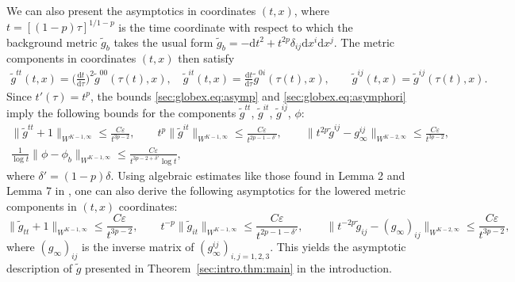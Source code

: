\documentclass{article}
\newcommand{\de}{\mathrm{d}}
\newcommand{\wt}{\widetilde}
\newcommand{\ve}{\varepsilon}
\begin{document}
\begin{remark}[Asymptotics]
    We can also present the asymptotics in coordinates $(t,x)$, where $t = [(1-p)\tau]^{1/1-p}$ is the time coordinate with respect to which the background metric $\wt{g}_b$ takes the usual form $\wt{g}_b = -\de t^2 +t^{2p}\delta_{ij}\de x^i\de x^j$. The metric components in coordinates $(t,x)$ then satisfy
    \begin{align}
        \wt{g}^{tt}(t,x) = \Big(\frac{\de t}{\de \tau}\Big)^2 \wt{g}^{00}(\tau(t),x),\quad \wt{g}^{it}(t,x) = \frac{\de t}{\de \tau}\wt{g}^{0i}(\tau(t),x),\qquad \wt{g}^{ij}(t,x) = \wt{g}^{ij}(\tau(t),x).
    \end{align}
    Since $t'(\tau) = t^p$, the bounds \eqref{sec:globex.eq:asymp} and \eqref{sec:globex.eq:asymphori} imply the following bounds for the components $\wt{g}^{tt}$, $\wt{g}^{it}$, $\wt{g}^{ij}$, $\phi$:
    \begin{gather}
        \|\wt{g}^{tt} + 1\|_{W^{K-1,\infty}} \leq \frac{C\ve}{t^{3p-2}},\qquad
        t^p\|\wt{g}^{it}\|_{W^{K-1,\infty}} \leq \frac{C\ve}{t^{2p-1-\delta'}},\qquad
        \|t^{2p}\wt{g}^{ij}-g_\infty^{ij}\|_{W^{K-2,\infty}} \leq \frac{C\ve}{t^{3p-2}},\\
        \frac{1}{\log t}\|\phi - \phi_b\|_{W^{K-1,\infty}} \leq \frac{C\ve}{t^{3p-2+\delta'}\log t},
    \end{gather}
    where $\delta' = (1-p)\delta$. Using algebraic estimates like those found in Lemma 2 and Lemma 7 in \cite{Rin:deSitterENSFstab08}, one can also derive the following asymptotics for the lowered metric components in $(t,x)$ coordinates:
    \begin{equation}
        \|\wt{g}_{tt} + 1\|_{W^{K-1,\infty}} \leq \frac{C\ve}{t^{3p-2}},\qquad
        t^{-p}\|\wt{g}_{it}\|_{W^{K-1,\infty}} \leq \frac{C\ve}{t^{2p-1-\delta'}},\qquad \|t^{-2p}\wt{g}_{ij}-(g_\infty)_{ij}\|_{W^{K-2,\infty}} \leq \frac{C\ve}{t^{3p-2}},
    \end{equation}
    where $(g_\infty)_{ij}$ is the inverse matrix of $(g_\infty^{ij})_{i,j=1,2,3}$. This yields the asymptotic description of $\wt{g}$ presented in Theorem~\ref{sec:intro.thm:main} in the introduction.
\end{remark}
\end{document}
